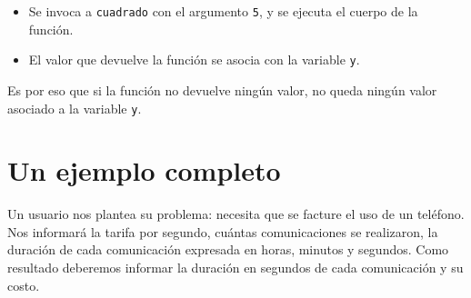 \begin{itemize}
\item Se invoca a \lstinline!cuadrado! con el argumento \lstinline!5!, y se ejecuta
el cuerpo de la función.
\item El valor que devuelve la función se asocia con la variable \lstinline!y!.
\end{itemize}

Es por eso que si la función no devuelve ningún valor, no queda ningún valor
asociado a la variable \lstinline!y!.

\section{Un ejemplo completo}

\begin{problemac}
Un usuario nos plantea su problema: necesita que se facture el uso de un teléfono.
Nos informará la tarifa por segundo, cuántas comunicaciones se realizaron,
la duración de cada comunicación expresada en horas, minutos y segundos.
Como resultado deberemos informar la duración en segundos de cada comunicación y
su costo.
\end{problemac}

